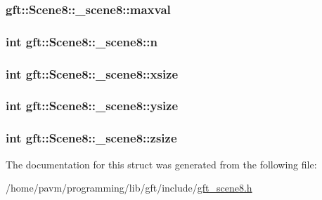 \hypertarget{structgft_1_1Scene8_1_1__scene8_a551af784995451a929073da897c4bb27}{
\subsubsection[{maxval}]{ gft\-::\-Scene8\-::\-\_\-scene8\-::maxval}}\label{structgft_1_1Scene8_1_1__scene8_a551af784995451a929073da897c4bb27}
\hypertarget{structgft_1_1Scene8_1_1__scene8_a4a7fd663bf97723061b167fbbcc24554}{
\subsubsection[{n}]{\setlength{\rightskip}{0pt plus 5cm}int gft\-::\-Scene8\-::\-\_\-scene8\-::n}}\label{structgft_1_1Scene8_1_1__scene8_a4a7fd663bf97723061b167fbbcc24554}
\hypertarget{structgft_1_1Scene8_1_1__scene8_ac686ab156e37bf22332b69cd7cf099c4}{
\subsubsection[{xsize}]{\setlength{\rightskip}{0pt plus 5cm}int gft\-::\-Scene8\-::\-\_\-scene8\-::xsize}}\label{structgft_1_1Scene8_1_1__scene8_ac686ab156e37bf22332b69cd7cf099c4}
\hypertarget{structgft_1_1Scene8_1_1__scene8_ae19304fd5aa167a6142b0637312a6da9}{
\subsubsection[{ysize}]{\setlength{\rightskip}{0pt plus 5cm}int gft\-::\-Scene8\-::\-\_\-scene8\-::ysize}}\label{structgft_1_1Scene8_1_1__scene8_ae19304fd5aa167a6142b0637312a6da9}
\hypertarget{structgft_1_1Scene8_1_1__scene8_a356d326df4b0c6d8e9695911f6459973}{
\subsubsection[{zsize}]{\setlength{\rightskip}{0pt plus 5cm}int gft\-::\-Scene8\-::\-\_\-scene8\-::zsize}}\label{structgft_1_1Scene8_1_1__scene8_a356d326df4b0c6d8e9695911f6459973}


The documentation for this struct was generated from the following file\-:\begin{DoxyCompactItemize}
\item 
/home/pavm/programming/lib/gft/include/\hyperlink{gft__scene8_8h}{gft\-\_\-scene8.\-h}\end{DoxyCompactItemize}
